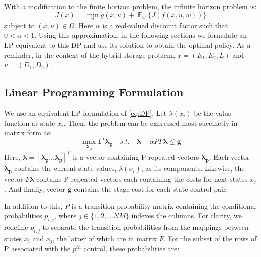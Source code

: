 \documentclass[conference]{IEEEtran}
\DeclareMathOperator{\E}{\mathbb{E}}
\begin{document}
With a modification to the finite horizon problem, the infinite horizon problem is:
\begin{equation} \label{eq:DP}
J(x)=\min_{u} g(x,u) + \mathop{\E}_{w} \{J(f(x,u,w))\}
\end{equation} subject to $(x,u)\in\Omega$. Here $\alpha$ is a real-valued discount factor such that $0<\alpha<1$. Using this approximation, in the following sections we formulate an LP equivalent to this DP and use its solution to obtain the optimal policy. As a reminder, in the context of the hybrid storage problem, $x=(E_{1},E_{2},L)$ and $u=(D_{1},D_{2})$.


\subsection{Linear Programming Formulation}
We use an equivalent LP formulation of \eqref{eq:DP}. Let $\lambda(x_{i})$ be the value function at state $x_{i}$. Then, the problem can be expressed most succinctly in matrix form as:
\begin{equation} \label{eq:prelimLPmtx}
    \max_{\boldsymbol{\lambda_{p}}} \boldsymbol{1}^{T} \boldsymbol{\lambda_{p}}
    \hspace{1em}s.t.\hspace{1em}
    \boldsymbol{\lambda}-\alpha PF\boldsymbol{\lambda} \leq \boldsymbol{g}
\end{equation} Here, $\boldsymbol{\lambda} = [\boldsymbol{\lambda_{p}}\hdots \boldsymbol{\lambda_{p}}]^{T}$ is a vector containing P repeated vectors $\boldsymbol{\lambda_{p}}$. Each vector $\boldsymbol{\lambda_{p}}$ contains the current state values, $\lambda(x_{i})$, as its components. Likewise, the vector $F\boldsymbol{\lambda}$ contains P repeated vectors each containing the costs for next states $x_{j}$. And finally, vector $\boldsymbol{g}$ contains the stage cost for each state-control pair. 

In addition to this, $P$ is a transition probability matrix containing the conditional probabilities $p_{i,j}$, where $j\in \{1,2,...NM\}$ indexes the columns. For clarity, we redefine $p_{i,j}$ to separate the transition probabilities from the mappings between states $x_{i}$ and $x_{j}$, the latter of which are in matrix $F$. For the subset of the rows of P associated with the $p^{th}$ control, these probabilities are:
\end{document}
